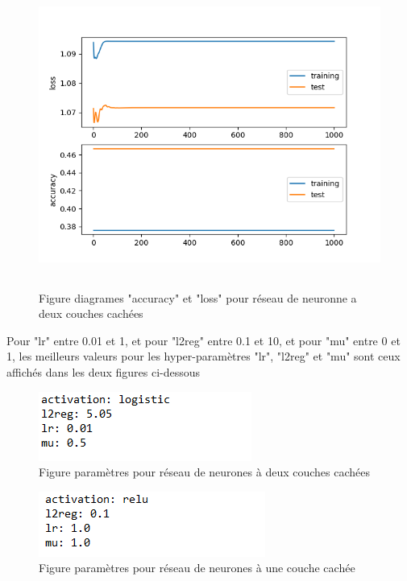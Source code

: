 \begin{figure}[H]
    \centering
    \includegraphics[width=17cm, height=10cm, keepaspectratio]{rn_plot.png}
    \caption{Figure diagrames "accuracy" et "loss" pour réseau de neuronne a deux couches cachées }
    \label{Figure diagrames "accuracy" et "loss" pour réseau de neuronne a deux couches cachées }
\end{figure}   
\par Pour "lr" entre 0.01 et 1, et pour "l2reg" entre 0.1 et 10, et pour "mu" entre 0 et 1, les meilleurs valeurs pour les hyper-paramètres "lr", "l2reg" et "mu" sont ceux affichés dans les deux figures ci-dessous
\begin{figure}[H]
    \centering
    \includegraphics{rn_param_logistic.PNG}
    \caption{Figure paramètres pour réseau de neurones à deux couches cachées}
    \label{paramètres pour une fonction d'activation logistique }
\end{figure}
\begin{figure}[H]
    \centering
    \includegraphics{rm_param_relu.PNG}
    \caption{Figure paramètres pour réseau de neurones à une couche cachée}
    \label{paramètres pour une fonction d'activation RELU }
\end{figure}
